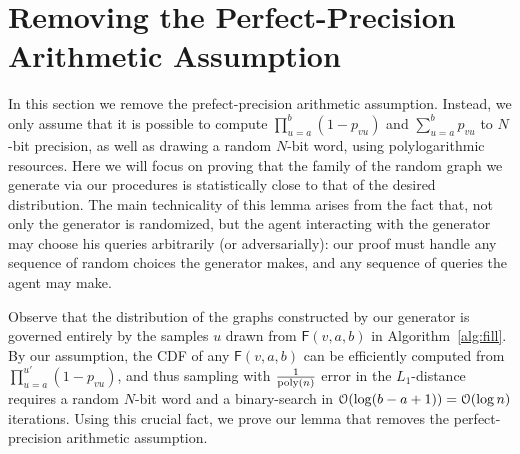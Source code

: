 \section{Removing the Perfect-Precision Arithmetic Assumption}
\label{sec:remove-perfect}

In this section we remove the prefect-precision arithmetic assumption. Instead, we only assume that it is possible to compute $\prod_{u=a}^b (1-p_{vu})$ and $\sum_{u=a}^b p_{vu}$ to $N$-bit precision, as well as drawing a random $N$-bit word, using polylogarithmic resources. Here we will focus on proving that the family of the random graph we generate via our procedures is statistically close to that of the desired distribution. The main technicality of this lemma arises from the fact that, not only the generator is randomized, but the agent interacting with the generator may choose his queries arbitrarily (or adversarially): our proof must handle any sequence of random choices the generator makes, and any sequence of queries the agent may make.

Observe that the distribution of the graphs constructed by our generator is governed entirely by the samples $u$ drawn from $\mathsf{F}(v,a,b)$ in Algorithm~\ref{alg:fill}. By our assumption, the CDF of any $\mathsf{F}(v,a,b)$ can be efficiently computed from $\prod_{u=a}^{u'} (1-p_{vu})$, and thus sampling with $\frac{1}{\mathrm{poly}(n)}$ error in the $L_1$-distance requires a random $N$-bit word and a binary-search in $\mathcal{O}(\log (b-a+1)) = \mathcal{O}(\log n)$ iterations. Using this crucial fact, we prove our lemma that removes the perfect-precision arithmetic assumption.


